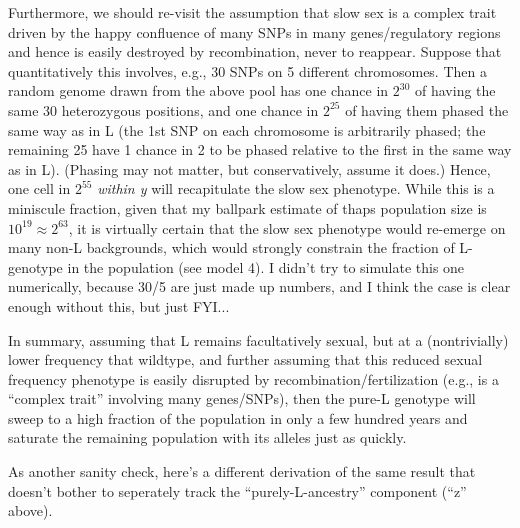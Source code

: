 \documentclass{article}\usepackage[]{graphicx}\usepackage[]{color}
\begin{document}
Furthermore, we should re-visit the assumption that slow sex is a complex trait driven by the happy
confluence of many SNPs in many genes/regulatory regions and hence is easily destroyed by
recombination, never to reappear.  Suppose that quantitatively this involves, e.g., 30 SNPs on 5
different chromosomes.  Then a random genome drawn from the above pool has one chance in $2^{30}$ of
having the same 30 heterozygous positions, and one chance in $2^{25}$ of having them phased the same
way as in L (the 1st SNP on each chromosome is arbitrarily phased; the remaining 25 have 1 chance in
2 to be phased relative to the first in the same way as in L).  (Phasing may not matter, but
conservatively, assume it does.)  Hence, one cell in $2^{55}$ \textit{within y} will recapitulate
the slow sex phenotype.  While this is a miniscule fraction, given that my ballpark estimate of
thaps population size is $10^{19}\approx2^{63}$, it is virtually certain that the slow sex phenotype
would re-emerge on many non-L backgrounds, which would strongly constrain the fraction of L-genotype
in the population (see model 4).  I didn't try to simulate this one numerically, because 30/5 are
just made up numbers, and I think the case is clear enough without this, but just FYI...

In summary, assuming that L remains facultatively sexual, but at a (nontrivially) lower frequency
that wildtype, and further assuming that this reduced sexual frequency phenotype is easily disrupted
by recombination/fertilization (e.g., is a ``complex trait'' involving many genes/SNPs), then the
pure-L genotype will sweep to a high fraction of the population in only a few hundred years and
saturate the remaining population with its alleles just as quickly.

As another sanity check, here's a different derivation of the same result that doesn't bother to
seperately track the ``purely-L-ancestry'' component (``z'' above).
\end{document}
